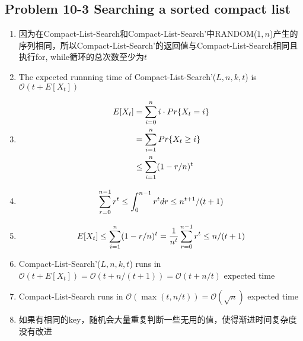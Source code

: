 \subsection*{Problem 10-3 Searching a sorted compact list}
\begin{enumerate}
	\item	因为在Compact-List-Search和Compact-List-Search'中RANDOM($1, n$)产生的序列相同，所以Compact-List-Search'的返回值与Compact-List-Search相同且执行for, while循环的总次数至少为$t$
	\item	The expected runnning time of Compact-List-Search'($L, n, k, t$) is $\mathcal{O}(t + E[X_t])$
	\item	\begin{equation} \notag
		\begin{aligned}
		E[X_t] & = \sum_{i = 0}^{n} i \cdot Pr\{X_t = i\} \\ & = \sum_{i = 1}^{n} Pr\{X_t \geq i\} \\ & \leq \sum_{i = 1}^{n} (1 - r / n)^t
		\end{aligned}
		\end{equation}
	\item	\begin{equation} \notag
			\sum_{r = 0}^{n - 1} r^t \leq \int_{0}^{n - 1} r^t dr \leq n^{t + 1}/ (t + 1)
		\end{equation}
	\item	\begin{equation} \notag
			E[X_t] \leq \sum_{i = 1}^{n} (1 - r / n)^t = \frac{1}{n^t} \sum_{r = 0}^{n - 1} r^t \leq n / (t + 1)
		\end{equation}
	\item	Compact-List-Search'($L, n, k, t$) runs in $\mathcal{O}(t + E[X_t]) = \mathcal{O}(t + n / (t + 1)) = \mathcal{O}(t + n / t)$ expected time
	\item	Compact-List-Search runs in $\mathcal{O}(\max(t, n / t)) = \mathcal{O}(\sqrt{n})$ expected time
	\item 	如果有相同的key，随机会大量重复判断一些无用的值，使得渐进时间复杂度没有改进
\end{enumerate}

